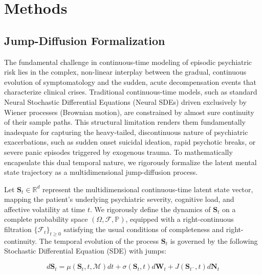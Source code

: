 \section{Methods}

\subsection{Jump-Diffusion Formalization}

The fundamental challenge in continuous-time modeling of episodic psychiatric risk lies in the complex, non-linear interplay between the gradual, continuous evolution of symptomatology and the sudden, acute decompensation events that characterize clinical crises. Traditional continuous-time models, such as standard Neural Stochastic Differential Equations (Neural SDEs) driven exclusively by Wiener processes (Brownian motion), are constrained by almost sure continuity of their sample paths. This structural limitation renders them fundamentally inadequate for capturing the heavy-tailed, discontinuous nature of psychiatric exacerbations, such as sudden onset suicidal ideation, rapid psychotic breaks, or severe panic episodes triggered by exogenous trauma. To mathematically encapsulate this dual temporal nature, we rigorously formalize the latent mental state trajectory as a multidimensional jump-diffusion process.

Let $\mathbf{S}_t \in \mathbb{R}^d$ represent the multidimensional continuous-time latent state vector, mapping the patient's underlying psychiatric severity, cognitive load, and affective volatility at time $t$. We rigorously define the dynamics of $\mathbf{S}_t$ on a complete probability space $(\Omega, \mathcal{F}, \mathbb{P})$, equipped with a right-continuous filtration $\{\mathcal{F}_t\}_{t \geq 0}$ satisfying the usual conditions of completeness and right-continuity. The temporal evolution of the process $\mathbf{S}_t$ is governed by the following Stochastic Differential Equation (SDE) with jumps:

\begin{equation}
d\mathbf{S}_t = \mu(\mathbf{S}_t, t, \mathcal{M}) dt + \sigma(\mathbf{S}_t, t) d\mathbf{W}_t + J(\mathbf{S}_{t^-}, t) d\mathbf{N}_t
\end{equation}

